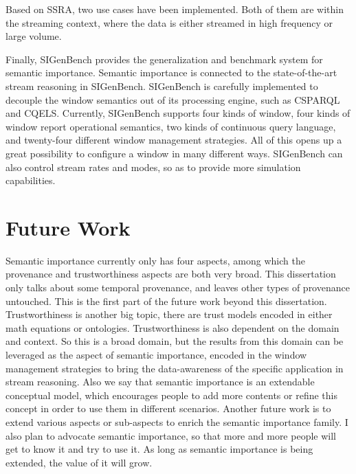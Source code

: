 Based on SSRA, two use cases have been implemented. 
Both of them are within the streaming context, where the data is either streamed in high frequency or large volume. 

Finally, SIGenBench provides the generalization and benchmark system for semantic importance. 
Semantic importance is connected to the state-of-the-art stream reasoning in SIGenBench. 
SIGenBench is carefully implemented to decouple the window semantics out of its processing engine, such as CSPARQL and CQELS. 
Currently, SIGenBench supports four kinds of window, four kinds of window report operational semantics, two kinds of continuous query language, and twenty-four different window management strategies. 
All of this opens up a great possibility to configure a window in many different ways. 
SIGenBench can also control stream rates and modes, so as to provide more simulation capabilities. 
%
\section{Future Work}
Semantic importance currently only has four aspects, among which the provenance and trustworthiness aspects are both very broad. 
This dissertation only talks about some temporal provenance, and leaves other types of provenance untouched. 
This is the first part of the future work beyond this dissertation. 
Trustworthiness is another big topic, there are trust models encoded in either math equations or ontologies.
Trustworthiness is also dependent on the domain and context. 
So this is a broad domain, but the results from this domain can be leveraged as the aspect of semantic importance, encoded in the window management strategies to bring the data-awareness of the specific application in stream reasoning.
Also we say that semantic importance is an extendable conceptual model, which encourages people to add more contents or refine this concept in order to use them in different scenarios. 
Another future work is to extend various aspects or sub-aspects to enrich the semantic importance family. 
I also plan to advocate semantic importance, so that more and more people will get to know it and try to use it. 
As long as semantic importance is being extended, the value of it will grow. 

